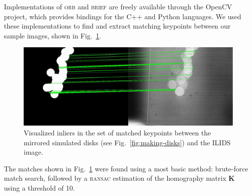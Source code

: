 \documentclass[11.5pt]{book}
\newcommand*{\figref}[1]{Fig.~\ref{#1}}
\begin{document}
Implementations of \textsc{orb} and \textsc{brief} are freely available through
the OpenCV project, which provides bindings for the C++ and Python languages. We
used these implementations to find and extract matching keypoints between our
sample images, shown in \figref{fig:matching}.

\begin{figure}
    \centering
    \includegraphics[width=\textwidth]{img/orb/asift-matching.jpg}
    \caption{Visualized inliers in the set of matched keypoints between the
    mirrored simulated disks (see \figref{fig:making-disks}) and the ILIDS image. \label{fig:matching}}
\end{figure}

The matches shown in \figref{fig:matching} were found using a most basic
method: brute-force match search, followed by a \textsc{ransac} estimation of the
homography matrix $\mathbf{K}$ using a threshold of 10.
\end{document}
